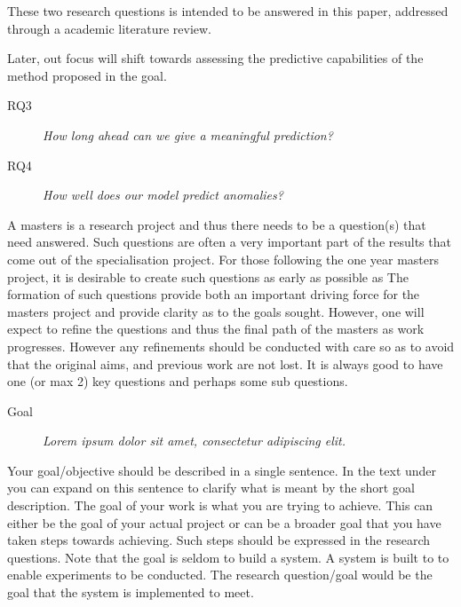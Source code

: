 These two research questions is intended to be answered in this paper, addressed through a academic literature review.
\newline

Later, out focus will shift towards assessing the predictive capabilities of the method proposed in the goal.

\begin{description}
    \item[RQ3]{\it How long ahead can we give a meaningful prediction?}
\end{description}

\begin{description}
    \item[RQ4]{\it How well does our model predict anomalies?}
\end{description}



\iffalse
A masters is a research project and thus there needs to be a question(s) that need answered.
Such questions are often a very important part of the results that come out of the specialisation project.
For those following the one year masters project, it is desirable to create such questions as early as possible as   The formation of such questions provide both an important driving force for the masters project and provide clarity as to the goals sought. However, one will expect to refine the questions and thus the final path of the masters as work progresses. However any refinements should be conducted with care so as to avoid that the original aims, and previous work are not lost.  
It is always good to have one (or max 2) key questions and perhaps some sub questions. 

\begin{description}
\item[Goal] {\it Lorem ipsum dolor sit amet, consectetur adipiscing elit.}
\end{description}

Your goal/objective should be described in a single sentence. In the text under you can expand on this sentence to clarify what is meant by the short goal description. 
The goal of your work is what you are trying to achieve. This can either be the goal of your actual project or can be a broader goal that you have taken steps towards achieving. Such steps should be expressed in the research questions. 
Note that the goal is seldom to build a system. A system is built to to enable experiments to be conducted. The research question/goal would be the goal that the system is implemented to meet.  


